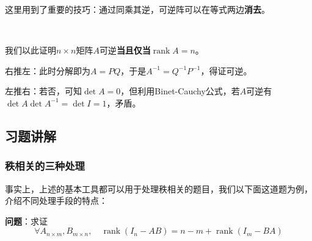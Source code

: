 \documentclass[a4paper,UTF8,fontset=windows]{ctexart}
\DeclareMathOperator{\rank}{rank}
\newcommand*{\note}{\noindent *}
\begin{document}
\note 这里用到了重要的技巧：通过同乘其逆，可逆阵可以在等式两边\textbf{消去}。

\

我们以此证明$n\times n$矩阵$A$可逆\textbf{当且仅当}$\rank A=n$。

右推左：此时分解即为$A=PQ$，于是$A^{-1}=Q^{-1}P^{-1}$，得证可逆。

左推右：若否，可知$\det A=0$，但利用Binet-Cauchy公式，若$A$可逆有$\det A\det A^{-1}=\det I=1$，矛盾。

\subsection{习题讲解}
\subsubsection{秩相关的三种处理}
事实上，上述的基本工具都可以用于处理秩相关的题目，我们以下面这道题为例，介绍不同处理手段的特点：

\textbf{问题}：求证
$$\forall A_{n\times m},B_{m\times n},\quad\rank(I_n-AB)=n-m+\rank(I_m-BA)$$
\end{document}
